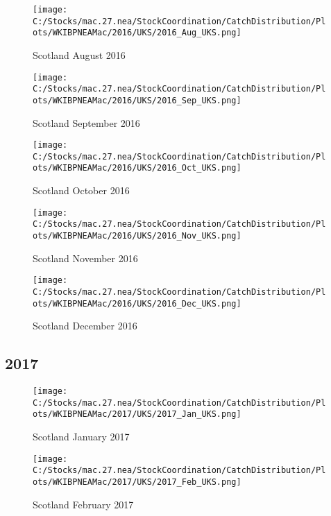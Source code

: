 \documentclass{article}
\begin{document}
\begin{figure}
	\centering
		\texttt{[image: C:/Stocks/mac.27.nea/StockCoordination/CatchDistribution/Plots/WKIBPNEAMac/2016/UKS/2016\_Aug\_UKS.png]}
	\caption{Scotland August 2016}
	\label{fig:2016_Aug_UKS}
\end{figure}

\begin{figure}
	\centering
		\texttt{[image: C:/Stocks/mac.27.nea/StockCoordination/CatchDistribution/Plots/WKIBPNEAMac/2016/UKS/2016\_Sep\_UKS.png]}
	\caption{Scotland September 2016}
	\label{fig:2016_Sep_UKS}
\end{figure}

\begin{figure}
	\centering
		\texttt{[image: C:/Stocks/mac.27.nea/StockCoordination/CatchDistribution/Plots/WKIBPNEAMac/2016/UKS/2016\_Oct\_UKS.png]}
	\caption{Scotland October 2016}
	\label{fig:2016_Oct_UKS}
\end{figure}

\begin{figure}
	\centering
		\texttt{[image: C:/Stocks/mac.27.nea/StockCoordination/CatchDistribution/Plots/WKIBPNEAMac/2016/UKS/2016\_Nov\_UKS.png]}
	\caption{Scotland November 2016}
	\label{fig:2016_Nov_UKS}
\end{figure}

\begin{figure}
	\centering
		\texttt{[image: C:/Stocks/mac.27.nea/StockCoordination/CatchDistribution/Plots/WKIBPNEAMac/2016/UKS/2016\_Dec\_UKS.png]}
	\caption{Scotland December 2016}
	\label{fig:2016_Dec_UKS}
\end{figure}


\clearpage

\newpage

\subsection{2017}



\begin{figure}[h]
	\centering
		\texttt{[image: C:/Stocks/mac.27.nea/StockCoordination/CatchDistribution/Plots/WKIBPNEAMac/2017/UKS/2017\_Jan\_UKS.png]}
	\caption{Scotland January 2017}
	\label{fig:2017_Jan_UKS}
\end{figure}

\begin{figure}
	\centering
		\texttt{[image: C:/Stocks/mac.27.nea/StockCoordination/CatchDistribution/Plots/WKIBPNEAMac/2017/UKS/2017\_Feb\_UKS.png]}
	\caption{Scotland February 2017}
	\label{fig:2017_Feb_UKS}
\end{figure}
\end{document}
